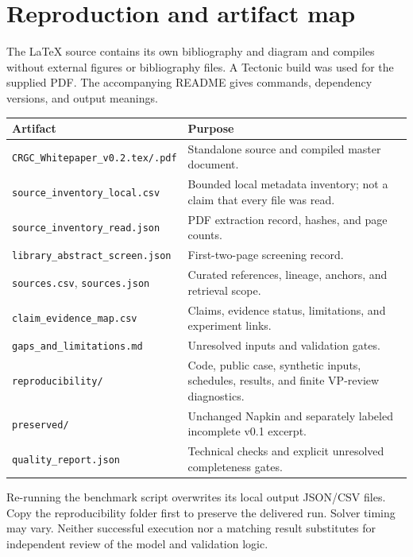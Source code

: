 \documentclass[11pt,letterpaper]{article}
\begin{document}
\appendix
\section{Reproduction and artifact map}
The LaTeX source contains its own bibliography and diagram and compiles without external figures or bibliography files. A Tectonic build was used for the supplied PDF. The accompanying README gives commands, dependency versions, and output meanings.

\begin{longtable}{P{.42\linewidth}P{.49\linewidth}}
\toprule Artifact & Purpose\\\midrule\endhead
\texttt{CRGC\_Whitepaper\_v0.2.tex/.pdf} & Standalone source and compiled master document.\\
\texttt{source\_inventory\_local.csv} & Bounded local metadata inventory; not a claim that every file was read.\\
\texttt{source\_inventory\_read.json} & PDF extraction record, hashes, and page counts.\\
\texttt{library\_abstract\_screen.json} & First-two-page screening record.\\
\texttt{sources.csv}, \texttt{sources.json} & Curated references, lineage, anchors, and retrieval scope.\\
\texttt{claim\_evidence\_map.csv} & Claims, evidence status, limitations, and experiment links.\\
\texttt{gaps\_and\_limitations.md} & Unresolved inputs and validation gates.\\
\texttt{reproducibility/} & Code, public case, synthetic inputs, schedules, results, and finite VP-review diagnostics.\\
\texttt{preserved/} & Unchanged Napkin and separately labeled incomplete v0.1 excerpt.\\
\texttt{quality\_report.json} & Technical checks and explicit unresolved completeness gates.\\
\bottomrule
\end{longtable}
Re-running the benchmark script overwrites its local output JSON/CSV files. Copy the reproducibility folder first to preserve the delivered run. Solver timing may vary. Neither successful execution nor a matching result substitutes for independent review of the model and validation logic.
\end{document}
